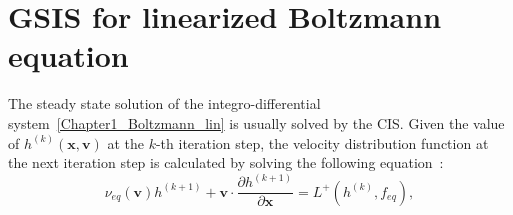 \section{GSIS for linearized Boltzmann equation}

The steady state solution of the integro-differential system~\eqref{Chapter1_Boltzmann_lin} is usually solved by the CIS. Given the value of $h^{(k)}(\bm{x},\bm{v})$ at the $k$-th iteration step, the velocity distribution function at the next iteration step is calculated by solving the following equation~\cite{ohwada1989numerical,Lei2013}:
\begin{equation}\label{LBE_Boltzmann_iteration}
\nu_{eq}(\bm{v})h^{(k+1)}+
\bm{v}\cdot\frac{\partial
	{h}^{(k+1)}}{\partial{\bm{x}}}=L^+(h^{(k)},f_{eq}),
\end{equation}



